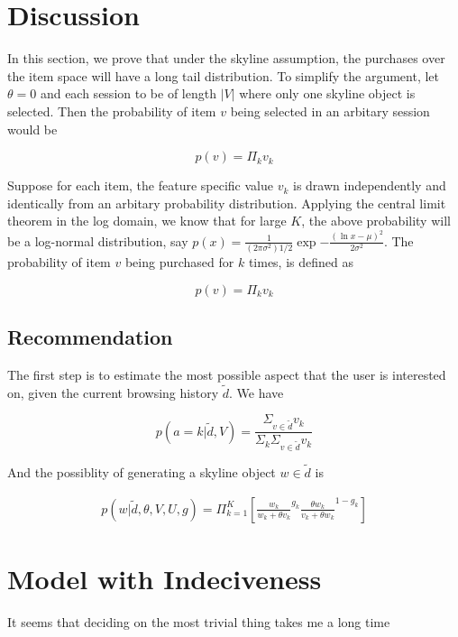 \documentclass{sig-alternate}
\begin{document}
\section{Discussion}

In this section, we prove that under the skyline assumption, the purchases over the item space will have a long tail distribution. To simplify the argument, let $\theta=0$ and each session to be of length $|V|$ where only one skyline object is selected. Then the probability of item $v$ being selected in an arbitary session would be 

\begin{equation*}
p(v)=\Pi_k v_k
\end{equation*}

Suppose for each item, the feature specific value $v_k$ is drawn independently and identically from an arbitary probability distribution. Applying the central limit theorem in the log domain, we know that for large $K$, the above probability will be a log-normal distribution, say $p(x)=\frac{1}{{(2\pi\sigma^2)}{1/2}}\exp{-\frac{{(\ln x - \mu)}^2}{2\sigma^2}}$. The probability of item $v$ being purchased for $k$ times, is defined as 

\begin{equation*}
p(v)=\Pi_k v_k
\end{equation*}

\subsection{Recommendation}
The first step is to estimate the most possible aspect that the user is interested on, given the current browsing history $\tilde{d}$. We have

\begin{equation}\label{aprobability}
p(a=k|\tilde{d},V)=\frac{\Sigma_{v\in \tilde{d}} v_k}{\Sigma_k \Sigma_{v\in \tilde{d}} v_k}
\end{equation}

And the possiblity of generating a skyline object $w\in \tilde{d}$ is 

\begin{align}\label{equ:skylineprobability}
		p(w|\tilde{d},\theta,V,U,g) %
		= \Pi_{k=1}^{K}[ {\frac{w_k}{w_k+\theta v_k}}^{g_k} { \frac{\theta w_{k}}{v_{k}+\theta w_{k}}}^{1-g_k}]
\end{align}

\section{Model with Indeciveness}
It seems that deciding on the most trivial thing takes me a long time


\end{document}

